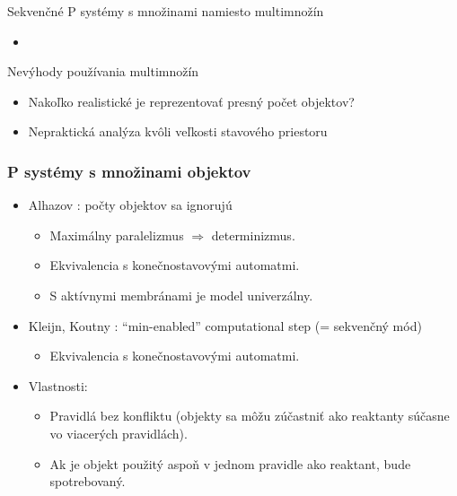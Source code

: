 \begin{frame}[t]{Sekvenčné P systémy s množinami namiesto multimnožín}
  \begin{itemize}
    \item {}
  \end{itemize}
\end{frame}

\begin{frame}[t]{Nevýhody používania multimnožín}
  \begin{itemize}
    \item Nakoľko realistické je reprezentovať presný počet objektov?
    \item Nepraktická analýza kvôli veľkosti stavového priestoru
  \end{itemize}
\end{frame}

\begin{frame}[t]\frametitle{P systémy s množinami objektov}
  \begin{itemize}
    \item Alhazov \cite{Alhazov05WithoutMultiplicities}: počty objektov sa ignorujú
    \pause
    \begin{itemize}
      \item Maximálny paralelizmus $\Rightarrow$ determinizmus.
      \pause
      \item Ekvivalencia s konečnostavovými automatmi.
      \pause
      \item S aktívnymi membránami je model univerzálny.
      \pause
    \end{itemize}
    \item Kleijn, Koutny \cite{Kleijn11SetMembrane}: ``min-enabled'' computational step (= sekvenčný mód)
    \pause
    \begin{itemize}
      \item Ekvivalencia s konečnostavovými automatmi.
    \end{itemize}
    \pause
    \item Vlastnosti:
    \begin{itemize}
      \item Pravidlá bez konfliktu (objekty sa môžu zúčastniť ako reaktanty súčasne vo viacerých pravidlách).
      \item Ak je objekt použitý aspoň v jednom pravidle ako reaktant, bude spotrebovaný.
    \end{itemize}
  \end{itemize}
\end{frame}
\note{}

